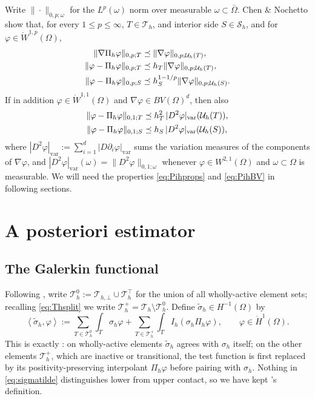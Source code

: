 \documentclass[12pt]{amsart}
\theoremstyle{definition}
\newcommand{\Om}{\Omega}
\newcommand{\Th}{\mathcal{T}_h}
\newcommand{\Sh}{\mathcal{S}_h}
\newcommand{\Ih}{I_h}
\newcommand{\Pih}{\Pi_h}
\newcommand{\Uh}{\mathcal{U}_h}
\newcommand{\Thbot}{\mathcal{T}_{h,\bot}}
\newcommand{\Thtop}{\Th^\top}
\newcommand{\Thplus}{\Th^+}
\newcommand{\Thzero}{\Th^0}
\begin{document}
Write $\|\cdot\|_{0,p;\omega}$ for the $L^p(\omega)$ norm over measurable $\omega \subset \bar\Om$.  Chen \& Nochetto \cite{ChenNochetto2000} show that, for every $1\le p\le\infty$, $T\in\Th$, and interior side $S\in\Sh$, and for $\varphi \in \mathring W^{1,p}(\Om)$,
\begin{align}
\label{eq:Pihprops}
  \|\nabla\Pih\varphi\|_{0,p;T} &\preceq \|\nabla\varphi\|_{0,p;\Uh(T)}, \\
  \|\varphi - \Pih\varphi\|_{0,p;T} &\preceq h_T\|\nabla\varphi\|_{0,p;\Uh(T)}, \notag \\
  \|\varphi - \Pih\varphi\|_{0,p;S} &\preceq h_S^{1-1/p}\|\nabla\varphi\|_{0,p;\Uh(S)}. \notag
\end{align}
If in addition $\varphi \in \mathring W^{1,1}(\Om)$ and $\nabla\varphi \in BV(\Om)^d$, then also
\begin{align}
\label{eq:PihBV}
  \|\varphi-\Pih\varphi\|_{0,1;T} &\preceq h_T^2\, |D^2\varphi|_{\mathrm{var}}(\Uh(T)), \\
  \|\varphi-\Pih\varphi\|_{0,1;S} &\preceq h_S\, |D^2\varphi|_{\mathrm{var}}(\Uh(S)), \notag
\end{align}
where $|D^2\varphi|_{\mathrm{var}} := \sum_{i=1}^d |D\partial_i\varphi|_{\mathrm{var}}$ sums the variation measures of the components of $\nabla\varphi$, and $|D^2\varphi|_{\mathrm{var}}(\omega) = \|D^2\varphi\|_{0,1;\omega}$ whenever $\varphi \in W^{2,1}(\Om)$ and $\omega \subset \Om$ is measurable.  We will need the properties \eqref{eq:Pihprops} and \eqref{eq:PihBV} in following sections.


\section{A posteriori estimator} \label{sec:estimator}

\subsection{The Galerkin functional}

Following \cite[\S 3]{NSV03}, write $\Thzero := \Thbot \cup \Thtop$ for the union of all wholly-active element sets; recalling \eqref{eq:Thsplit} we write $\Thplus = \Th \setminus \Thzero$.  Define $\tilde\sigma_h \in H^{-1}(\Om)$ by
\begin{equation}
\label{eq:sigmatilde}
  \left<\tilde\sigma_h,\varphi\right> := \sum_{T\in\Thzero}\int_T \sigma_h\varphi + \sum_{T\in\Thplus}\int_T \Ih(\sigma_h\Pih\varphi), \qquad \varphi \in \mathring H^1(\Om).
\end{equation}
This is exactly \cite[formula (3.1)]{NSV03}: on wholly-active elements $\tilde\sigma_h$ agrees with $\sigma_h$ itself; on the other elements $\Thplus$, which are inactive or transitional, the test function is first replaced by its positivity-preserving interpolant $\Pih\varphi$ before pairing with $\sigma_h$.  Nothing in \eqref{eq:sigmatilde} distinguishes lower from upper contact, so we have kept \cite{NSV03}'s definition.
\end{document}
